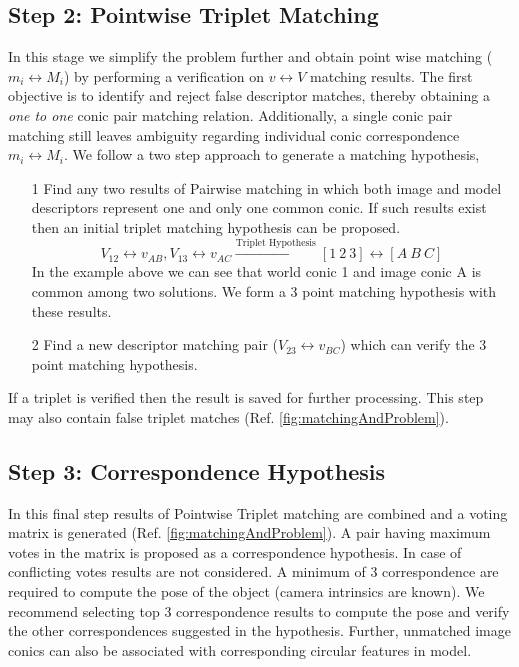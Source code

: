 \documentclass{bmvc2k}
\begin{document}
\subsection{Step 2: Pointwise Triplet Matching}
In this stage we simplify the problem further and obtain point wise matching ($ m_i \leftrightarrow M_i $) by performing a verification on $ v \leftrightarrow V $ matching results. 
The first objective is to identify and reject false descriptor matches, thereby obtaining a \textit{one to one} conic pair matching relation. Additionally, a single conic pair matching still leaves ambiguity regarding individual conic correspondence $ m_i \leftrightarrow M_i $. 
We follow a two step approach to generate a matching hypothesis,
\begin{enumerate}
\item[1] Find any two results of Pairwise matching in which both image and model descriptors represent one and only one common conic. If such results exist then an initial triplet matching hypothesis can be proposed.
\[
 V_{12} \leftrightarrow v_{AB},V_{13} \leftrightarrow v_{AC } \xrightarrow{\text{Triplet Hypothesis}} [1~2~3] \leftrightarrow [A~B~ C]
\]
In the example above we can see that world conic 1 and image conic A is common among two solutions. We form a 3 point matching hypothesis with these results. 
\item[2] Find a new descriptor matching pair ($ V_{23} \leftrightarrow v_{BC}$) which can verify the 3 point matching hypothesis.
\end{enumerate}
If a triplet is verified then the result is saved for further processing. This step may also contain false triplet matches (Ref. \ref{fig:matchingAndProblem}). 

\subsection{Step 3: Correspondence Hypothesis }
In this final step results of Pointwise Triplet matching are combined and a voting matrix is generated (Ref. \ref{fig:matchingAndProblem}). A pair having maximum votes in the matrix is proposed as a correspondence hypothesis. In case of conflicting votes results are not considered. A minimum of 3 correspondence are required to compute the pose of the object \cite{lepetit_monocular_2005}(camera intrinsics are known). We recommend selecting top 3 correspondence results to compute the pose and verify the other correspondences suggested in the hypothesis. Further, unmatched image conics can also be associated with corresponding circular features in model.
\end{document}
